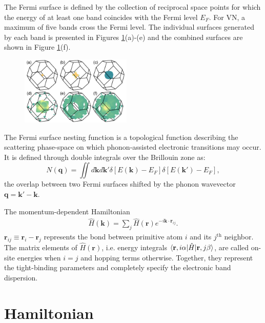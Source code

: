 \documentclass[twocolumn,showpacs,preprintnumbers,superscriptaddress,prb,floatfix,aps,10pt]{revtex4-1}
\renewcommand{\vec}[1]{\ensuremath{\mathbf{#1}}}
\newcommand*{\ham}{\hat{H}}
\newcommand*{\bondvec}{\vec{r}_{ij}}
\begin{document}
The Fermi surface is defined by the collection of reciprocal space points for which the energy of at least one band coincides with the Fermi level $E_F$. For VN, a maximum of five bands cross the Fermi level. The individual surfaces generated by each band is presented in Figures \ref{fig:fermi_surface}(a)-(e) and the combined surfaces are shown in Figure \ref{fig:fermi_surface}(f).
%
\begin{figure}[h]
\includegraphics[width=0.47\textwidth]{Figure_2_fermi_surface.png}
\caption[LRC circuit response.]{\label{fig:fermi_surface} }
\end{figure}
%

The Fermi surface nesting function is a topological function describing the scattering phase-space on which phonon-assisted electronic transitions may occur. It is defined through double integrals over the Brillouin zone as:
\begin{equation}
\label{eq:nesting}
N(\vec{q}) = \iint d\vec{k}d\vec{k'} \delta\left[ E(\vec{k}) - E_F \right] \delta\left[ E(\vec{k'}) - E_F \right], 
\end{equation}
the overlap between two Fermi surfaces shifted by the phonon wavevector $\vec{q} = \vec{k'} - \vec{k}$.





The momentum-dependent Hamiltonian
\begin{align}
\label{eq:matrix_element}
\ham(\vec{k}) = \sum_j \ham(\vec{r}) e^{-i \vec{k}\cdot\vec{r}_{ij}} .
\end{align}
%
$\bondvec \equiv \vec{r}_i - \vec{r}_j$ represents the bond between primitive atom $i$ and its $j^{\textrm{th}}$ neighbor. The matrix elements of $\ham(\vec{r})$, i.e. energy integrals $\braket{\vec{r},i\alpha | \ham | \vec{r},j\beta}$, are called on-site energies when $i=j$ and hopping terms otherwise. Together, they represent the tight-binding parameters and completely specify the electronic band dispersion. 
\section{Hamiltonian}
\end{document}

